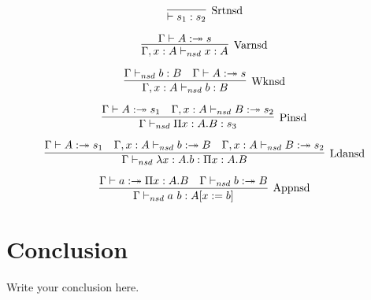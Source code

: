 \documentclass{article}
\theoremstyle{definition}
\theoremstyle{remark}
\begin{document}
\begin{equation}
    \label{simple_equation}
\infer[\mathrm{Srtnsd}]
{\vdash s_{1} : s_{2}}{}
\end{equation}

\begin{equation}
    \label{simple_equation}
\infer[\mathrm{Varnsd}]
{\Gamma, x:A \vdash_{nsd} x : A}{\Gamma \vdash A :\twoheadrightarrow s}
\end{equation}

\begin{equation}
    \label{simple_equation}
\infer[\mathrm{Wknsd}]
{\Gamma, x:A \vdash_{nsd} b : B}{\Gamma \vdash_{nsd} b : B & \Gamma \vdash A :\twoheadrightarrow s}
\end{equation}

\begin{equation}
    \label{simple_equation}
\infer[\mathrm{Pinsd}]
{\Gamma \vdash_{nsd} \Pi x:A.B :s_{3}}{\Gamma \vdash A :\twoheadrightarrow s_{1} & \Gamma, x:A \vdash_{nsd} B :\twoheadrightarrow s_{2}}
\end{equation}

\begin{equation}
    \label{simple_equation}
\infer[\mathrm{Ldansd}]
{\Gamma \vdash_{nsd} \lambda x:A.b :\Pi x:A.B}{\Gamma \vdash A :\twoheadrightarrow s_{1} & \Gamma, x:A \vdash_{nsd} b:\twoheadrightarrow B & \Gamma, x:A \vdash_{nsd} B :\twoheadrightarrow s_{2}}
\end{equation}

\begin{equation}
    \label{simple_equation}
\infer[\mathrm{Appnsd}]
{\Gamma \vdash_{nsd} a\ b : A[x:=b]}{\Gamma \vdash a :\twoheadrightarrow \Pi x:A.B & \Gamma \vdash_{nsd} b:\twoheadrightarrow B }
\end{equation}


\section{Conclusion}
Write your conclusion here.


{}

\end{document}
